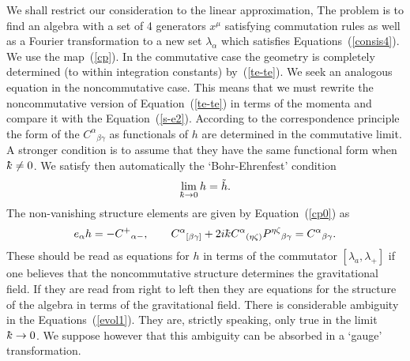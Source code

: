 \documentclass[12pt,a4paper]{article}
\newcounter{eg}
\def\t#1{\tilde #1}
\def\kbar{{\mathchar'26\mkern-9muk}}
\begin{document}
We shall restrict our consideration to the linear approximation, The
problem is to find an algebra with a set of 4 generators $x^\mu$
satisfying commutation rules as well as a Fourier transformation to a
new set $\lambda_\alpha$ which satisfies Equations~(\ref{consis4}).
We use the map~(\ref{cp}). In the commutative case the geometry is
completely determined (to within integration constants)
by~(\ref{te-te}). We seek an analogous equation in the noncommutative
case. This means that we must rewrite the noncommutative version
of Equation~(\ref{te-te}) in terms of the momenta and compare it with the
Equation~(\ref{s-e2}).  According to the correspondence principle
the form of the $C^\alpha{}_{\beta\gamma}$ as functionals of $h$ are
determined in the commutative limit. A stronger condition is to assume
that they have the same functional form when $\kbar \neq 0$. We
satisfy then automatically the `Bohr-Ehrenfest' condition
\begin{equation}
\lim_{\kbar\to 0} h = \t{h}.
\end{equation}
The non-vanishing structure elements are given by
Equation~(\ref{cp0}) as 
\begin{equation}
e_\alpha h = - C^+{}_{\alpha -}, \qquad
C^\alpha{}_{[\beta\gamma]} + 2i\kbar 
C^\alpha{}_{(\eta\zeta)} P^{\eta\zeta}{}_{\beta\gamma} =
C^\alpha{}_{\beta\gamma}.                              \label{evol1}
\end{equation}
These should be read as equations for $h$ in terms of the commutator
$[\lambda_a,\lambda_+]$ if one believes that the noncommutative
structure determines the gravitational field. If they are read from
right to left then they are equations for the structure of the algebra
in terms of the gravitational field. There is considerable ambiguity
in the Equations~(\ref{evol1}). They are, strictly speaking, only true
in the limit $\kbar\to 0$. We suppose however that this ambiguity can
be absorbed in a `gauge' transformation.
\end{document}
